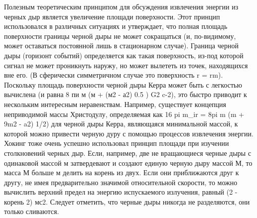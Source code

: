 \documentclass[a4paper, 10pt, twocolumn]{article}
\begin{document}
Полезным теоретическим принципом для обсуждения извлечения энергии из 
черных дыр является увеличение площади поверхности. Этот принцип 
использовался в различных ситуациях и утверждает, что полная площадь 
поверхности границы черной дыры не может сокращаться (и, по-видимому, 
может оставаться постоянной лишь в стационарном случае). Граница черной 
дыры (горизонт событий) определяется как такая поверхность, из-под 
которой сигнал не может проникнуть наружу, но может вылететь из точек, 
находящихся вне его. (В сферически симметричном случае это поверхность 
r = rm). Поскольку площадь поверхности черной дыры Керра может быть 
с легкостью вычислена (и равна 8 пи м (м + (м2 - а2) 0.5 ) G2 c-2), это 
быстро приводит к нескольким интересным неравенствам. Например, 
существует концепция неприводимой массы Христодулу, определяемая как 16 
pi m\_ir = 8pi m (m + 9m2 - a2) 1/2) для черной дыры Керра, являющаяся 
минимальной массой, к которой можно привести черную дуру с помощью 
процессов извлечения энергии. Хокинг тоже очень успешно использовал 
принцип площади при изучении столкновений черных дыр. Если, например, 
две не вращающиеся черные дыры с одинаковой массой м затвердевают 
и создают единую черную дыру массой М, то масса М больше м делить на 
корень из двух. Если они приближаются друг к другу, не имея 
предварительно значимой относительной скорости, то можно вычислить 
верхний предел на энергию испускаемого излучения, равный (2 - корень 2) 
мс2. Следует отметить, что черные дыры никогда не разделяются, они 
только сливаются.
\end{document}
